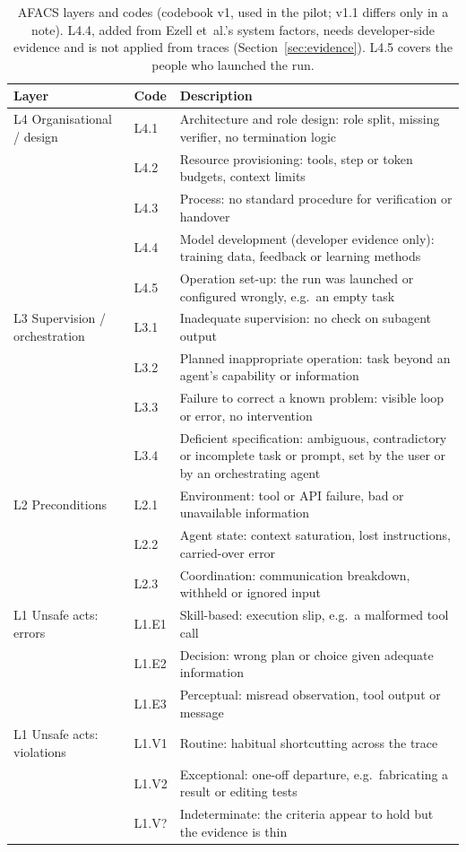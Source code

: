\documentclass[11pt]{article}
\begin{document}
\begin{table}[tbp]
\centering
\caption{AFACS layers and codes (codebook v1, used in the pilot; v1.1 differs only in a note). L4.4, added from Ezell et~al.'s
system factors, needs developer-side evidence and is not applied from traces
(Section~\ref{sec:evidence}). L4.5 covers the people who launched the run.}
\label{tab:codes}
\small
\begin{tabular}{@{}L{3.3cm}lL{9.6cm}@{}}
\toprule
Layer & Code & Description\\
\midrule
L4 Organisational / design & L4.1 & Architecture and role design: role split, missing verifier, no termination logic\\
 & L4.2 & Resource provisioning: tools, step or token budgets, context limits\\
 & L4.3 & Process: no standard procedure for verification or handover\\
 & L4.4 & Model development (developer evidence only): training data, feedback or learning methods\\
 & L4.5 & Operation set-up: the run was launched or configured wrongly, e.g.\ an empty task\\
\midrule
L3 Supervision / orchestration & L3.1 & Inadequate supervision: no check on subagent output\\
 & L3.2 & Planned inappropriate operation: task beyond an agent's capability or information\\
 & L3.3 & Failure to correct a known problem: visible loop or error, no intervention\\
 & L3.4 & Deficient specification: ambiguous, contradictory or incomplete task or prompt, set by the user or by an orchestrating agent\\
\midrule
L2 Preconditions & L2.1 & Environment: tool or API failure, bad or unavailable information\\
 & L2.2 & Agent state: context saturation, lost instructions, carried-over error\\
 & L2.3 & Coordination: communication breakdown, withheld or ignored input\\
\midrule
L1 Unsafe acts: errors & L1.E1 & Skill-based: execution slip, e.g.\ a malformed tool call\\
 & L1.E2 & Decision: wrong plan or choice given adequate information\\
 & L1.E3 & Perceptual: misread observation, tool output or message\\
L1 Unsafe acts: violations & L1.V1 & Routine: habitual shortcutting across the trace\\
 & L1.V2 & Exceptional: one-off departure, e.g.\ fabricating a result or editing tests\\
 & L1.V? & Indeterminate: the criteria appear to hold but the evidence is thin\\
\bottomrule
\end{tabular}
\end{table}
\end{document}
